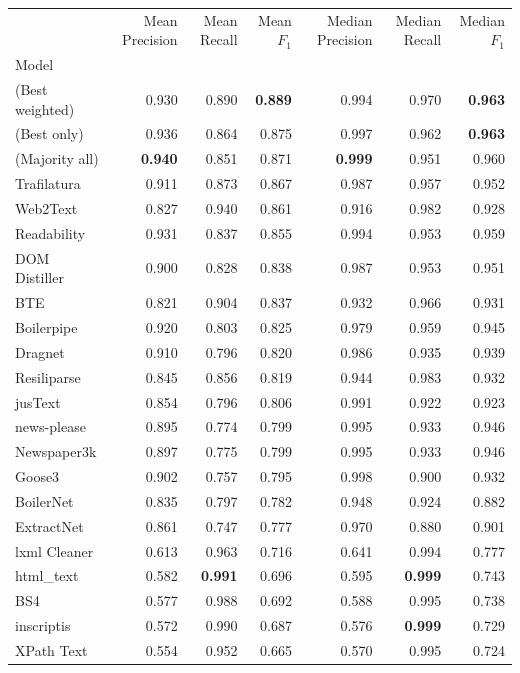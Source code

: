 \begin{tabular}{lrrrrrr}
 & Mean Precision & Mean Recall & Mean $F_1$ & Median Precision & Median Recall & Median $F_1$ \\
Model &  &  &  &  &  &  \\
(Best weighted) & 0.930 & 0.890 & \bf 0.889 & 0.994 & 0.970 & \bf 0.963 \\
(Best only) & 0.936 & 0.864 & 0.875 & 0.997 & 0.962 & \bf 0.963 \\
(Majority all) & \bf 0.940 & 0.851 & 0.871 & \bf 0.999 & 0.951 & 0.960 \\
Trafilatura & 0.911 & 0.873 & 0.867 & 0.987 & 0.957 & 0.952 \\
Web2Text & 0.827 & 0.940 & 0.861 & 0.916 & 0.982 & 0.928 \\
Readability & 0.931 & 0.837 & 0.855 & 0.994 & 0.953 & 0.959 \\
DOM Distiller & 0.900 & 0.828 & 0.838 & 0.987 & 0.953 & 0.951 \\
BTE & 0.821 & 0.904 & 0.837 & 0.932 & 0.966 & 0.931 \\
Boilerpipe & 0.920 & 0.803 & 0.825 & 0.979 & 0.959 & 0.945 \\
Dragnet & 0.910 & 0.796 & 0.820 & 0.986 & 0.935 & 0.939 \\
Resiliparse & 0.845 & 0.856 & 0.819 & 0.944 & 0.983 & 0.932 \\
jusText & 0.854 & 0.796 & 0.806 & 0.991 & 0.922 & 0.923 \\
news-please & 0.895 & 0.774 & 0.799 & 0.995 & 0.933 & 0.946 \\
Newspaper3k & 0.897 & 0.775 & 0.799 & 0.995 & 0.933 & 0.946 \\
Goose3 & 0.902 & 0.757 & 0.795 & 0.998 & 0.900 & 0.932 \\
BoilerNet & 0.835 & 0.797 & 0.782 & 0.948 & 0.924 & 0.882 \\
ExtractNet & 0.861 & 0.747 & 0.777 & 0.970 & 0.880 & 0.901 \\
lxml Cleaner & 0.613 & 0.963 & 0.716 & 0.641 & 0.994 & 0.777 \\
html_text & 0.582 & \bf 0.991 & 0.696 & 0.595 & \bf 0.999 & 0.743 \\
BS4 & 0.577 & 0.988 & 0.692 & 0.588 & 0.995 & 0.738 \\
inscriptis & 0.572 & 0.990 & 0.687 & 0.576 & \bf 0.999 & 0.729 \\
XPath Text & 0.554 & 0.952 & 0.665 & 0.570 & 0.995 & 0.724 \\
\end{tabular}
